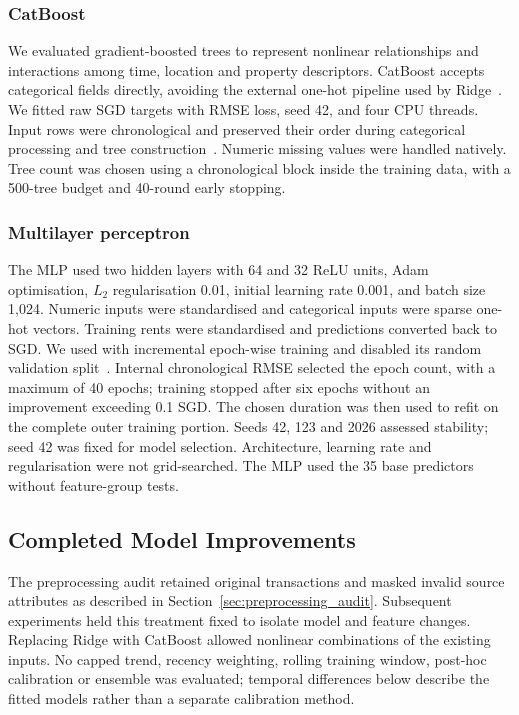 \documentclass[conference]{IEEEtran}
\newcommand{\field}[1]{\texttt{\detokenize{#1}}}
\begin{document}
\subsubsection{CatBoost}
We evaluated gradient-boosted trees to represent nonlinear relationships
and interactions among time, location and property descriptors. CatBoost
accepts categorical fields directly, avoiding the external one-hot pipeline
used by Ridge~\cite{final_model_reference}. We fitted raw SGD targets with
RMSE loss, seed 42, and four CPU threads. Input rows were chronological and
\field{has_time=True} preserved their order during categorical processing
and tree construction~\cite{catboost_parameters}. Numeric missing values
were handled natively. Tree count was chosen using a chronological block
inside the training data, with a 500-tree budget and 40-round early stopping.

\subsubsection{Multilayer perceptron}
The MLP used two hidden layers with 64 and 32 ReLU units, Adam optimisation,
$L_2$ regularisation 0.01, initial learning rate 0.001, and batch size 1,024.
Numeric inputs were standardised and categorical inputs were sparse one-hot
vectors. Training rents were standardised and predictions converted back
to SGD. We used \field{MLPRegressor} with incremental epoch-wise training
and disabled its random validation split~\cite{mlp_reference}. Internal
chronological RMSE selected the epoch count, with a maximum of 40 epochs;
training stopped after six epochs without an improvement exceeding 0.1 SGD.
The chosen duration was then used to refit on the complete outer training
portion. Seeds 42, 123 and 2026 assessed stability; seed 42 was fixed for
model selection. Architecture, learning rate and regularisation were not
grid-searched. The MLP used the 35 base predictors without feature-group tests.

\subsection{Completed Model Improvements}
\label{sec:improvements}
The preprocessing audit retained original transactions and masked invalid
source attributes as described in Section~\ref{sec:preprocessing_audit}.
Subsequent experiments held this treatment fixed to isolate model and
feature changes. Replacing Ridge with CatBoost allowed nonlinear combinations
of the existing inputs. No capped trend, recency weighting, rolling training
window, post-hoc calibration or ensemble was evaluated; temporal differences
below describe the fitted models rather than a separate calibration method.
\end{document}
